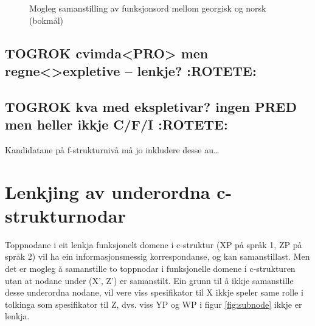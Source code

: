 \documentclass[11pt,a4paper,oneside,draft]{book}
\begin{document}
  \begin{figure}[htp]
   \vfill{} %
  
  \caption{Mogleg samanstilling av funksjonsord mellom georgisk og norsk (bokmål)}
   \label{fig:fnord}
  \end{figure}
\subsection{\textbf{TOGROK} cvimda<PRO> men regne<>expletive -- lenkje? \textbf{:ROTETE:}}
\label{sec-3.6.1}

\subsection{\textbf{TOGROK} kva med ekspletivar? ingen PRED men heller ikkje C/F/I \textbf{:ROTETE:}}
\label{sec-3.6.2}

Kandidatane på f-strukturnivå må jo inkludere desse au\ldots{}

\section{Lenkjing av underordna c-strukturnodar}
\label{sec-3.7}

\label{SEC:subnode}

Toppnodane i eit lenkja funksjonelt domene i c-struktur (XP på språk
1, ZP på språk 2) vil ha ein informasjonsmessig korrespondanse, og kan
samanstillast. Men det er mogleg å samanstille to toppnodar i
funksjonelle domene i c-strukturen utan at nodane under (X', Z') er
samanstilt. Ein grunn til å ikkje samanstille desse underordna nodane,
vil vere viss spesifikator til X ikkje speler same rolle i tolkinga
som spesifikator til Z, dvs. viss YP og WP i figur \ref{fig:subnode}
ikkje er lenkja.
\end{document}
